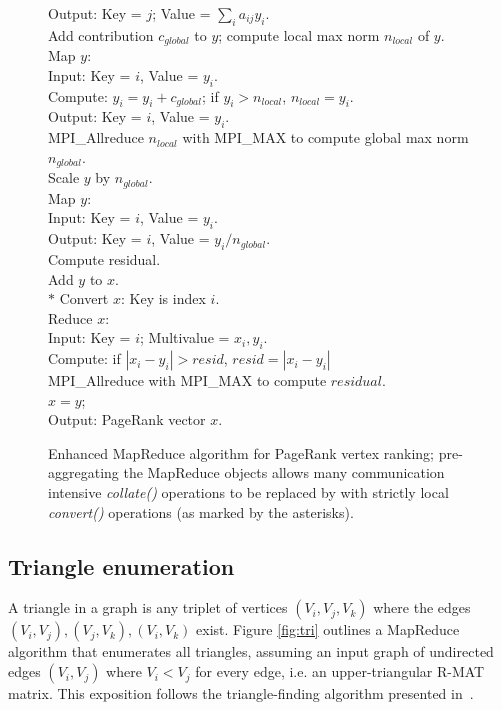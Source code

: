 \begin{figure}[htb]
\begin{center}
{\begin{minipage}{\textwidth}
\begin{tabbing}
\> \> \> Output:  Key = $j$; Value = $\sum_i a_{ij} y_i$. \\
\> Add contribution $c_{global}$ to $y$; compute local max norm $n_{local}$ of $y$. \\
\> \> Map $y$:  \\
\> \> \> Input:  Key = $i$, Value = $y_i$. \\
\> \> \> Compute: $y_i = y_i + c_{global}$; if $y_i > {n_{local}}$, $n_{local} = y_i$. \\
\> \> \> Output:  Key = $i$, Value = $y_i$. \\
\> \> MPI\_Allreduce $n_{local}$ with MPI\_MAX to compute global max norm $n_{global}$. \\
\> Scale $y$ by $n_{global}$. \\
\> \> Map $y$: \\
\> \> \> Input:  Key = $i$, Value = $y_i$. \\
\> \> \> Output:  Key = $i$, Value = $y_i / {n_{global}}$. \\
\> Compute residual. \\
\> \> Add $y$ to $x$. \\
$*$\> \> Convert $x$:  Key is index $i$. \\
\> \> Reduce $x$:   \\
\> \> \> Input:  Key = $i$; Multivalue = $x_i, y_i$. \\
\> \> \> Compute:  if $|x_i - y_i| > {resid}$, ${resid} = |x_i - y_i|$ \\
\> \> MPI\_Allreduce with MPI\_MAX to compute $residual$. \\
\> $x = y$; \\
Output:  PageRank vector $x$.
  \end{tabbing}
 \end{minipage}}\end{center}

 \caption{Enhanced MapReduce algorithm for PageRank vertex ranking; pre-aggregating the MapReduce objects allows many communication intensive {\it collate()} 
operations to be replaced by with strictly local {\it convert()} operations (as marked by the asterisks).}

 \label{fig:pr2}
\end{figure}


\subsection{Triangle enumeration}

A triangle in a graph is any triplet of vertices $(V_i,V_j,V_k)$ where
the edges $(V_i,V_j), (V_j,V_k), (V_i,V_k)$ exist.  Figure
\ref{fig:tri} outlines a MapReduce algorithm that enumerates all
triangles, assuming an input graph of undirected edges $(V_i,V_j)$
where $V_i < V_j$ for every edge, i.e. an upper-triangular R-MAT
matrix.  This exposition follows the triangle-finding algorithm
presented in~\cite{Cohen09}.

